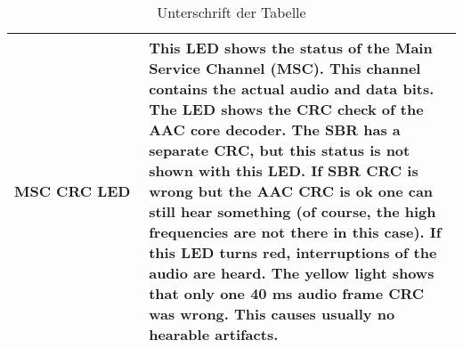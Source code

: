 \begin{table}[h]
\begin{center}
\begin{tabular}{p{0.3\linewidth} | p{0.7\linewidth}}
			\textbf{MSC CRC LED} & This LED shows the status of the Main Service Channel (MSC). This channel contains the actual audio and data bits. The LED shows the CRC check of the AAC core decoder. The SBR has a separate CRC, but this status is not shown with this LED. If SBR CRC is wrong but the AAC CRC is ok one can still hear something (of course, the high frequencies are not there in this case). If this LED turns red, interruptions of the audio are heard. The yellow light shows that only one 40 ms audio frame CRC was wrong. This causes usually no hearable artifacts.\\
			
			
			
			
			
			\hline
		\end{tabular}
		\caption{Unterschrift  der Tabelle}
		\label{tab:Tabelle1}
	\end{center}
\end{table}

